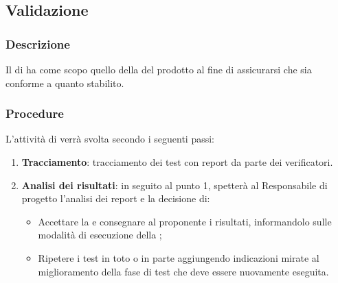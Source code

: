 \subsection{Validazione}
\label{sec:validazione}
\subsubsection{Descrizione}
Il  di  ha come scopo quello della  del prodotto al fine di assicurarsi che sia conforme a quanto stabilito.
\subsubsection{Procedure}
L’attività di  verrà svolta secondo i seguenti passi:
\begin{enumerate} 
    \item \textbf{Tracciamento}: tracciamento dei test con report da parte dei verificatori.
    \item \textbf{Analisi dei risultati}: in seguito al punto 1, spetterà al Responsabile di progetto l’analisi dei report e la decisione di:
    \begin{itemize}
        \item Accettare la  e consegnare al proponente i risultati, informandolo sulle modalità di esecuzione della ;
        \item Ripetere i test in toto o in parte aggiungendo indicazioni mirate al miglioramento della fase di test che deve essere nuovamente eseguita.
    \end{itemize}
\end{enumerate}
